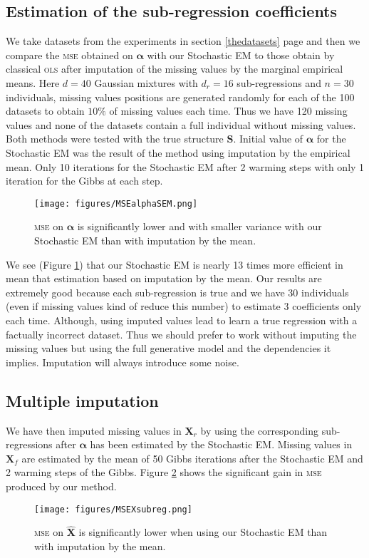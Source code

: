 \documentclass[12pt,a4paper]{report}
\begin{document}
		\subsection{Estimation of the sub-regression coefficients}
			We take datasets from the experiments in section \ref{thedatasets} page \pageref{thedatasets} and then we compare the \textsc{mse} obtained on $\boldsymbol{\alpha}$ with our Stochastic EM to those obtain by classical \textsc{ols} after imputation of the missing values by the marginal empirical means. Here $d=40$ Gaussian mixtures with $d_r=16$ sub-regressions and $n=30$ individuals,  missing values positions are generated randomly for each of the 100 datasets to obtain $10 \%$ of missing values each time. Thus we have 120 missing values and none of the datasets contain a full individual without missing values.
Both methods were tested with the true structure $\boldsymbol{S}$. Initial value of $\boldsymbol{\alpha}$ for the Stochastic EM was the result of the method using imputation by the empirical mean. Only 10 iterations for the Stochastic EM after 2 warming steps with only 1 iteration for the Gibbs at each step.

\begin{figure}[h!]
	\centering
	\texttt{[image: figures/MSEalphaSEM.png]} 
	\caption{\textsc{mse} on $\boldsymbol{\alpha}$ is significantly lower and with smaller variance with our Stochastic EM than with imputation by the mean.}\label{MSEalphaSEM}
\end{figure}

	We see (Figure \ref{MSEalphaSEM}) that our Stochastic EM is nearly 13 times more efficient in mean that estimation based on imputation by the mean. Our results are extremely good because each sub-regression is true and we have 30 individuals (even if missing values kind of reduce this number) to estimate 3 coefficients only each time. Although, using imputed values lead to learn a true regression with a factually incorrect dataset. Thus we should prefer to work without imputing the missing values but using the full generative model and the dependencies it implies. Imputation will always introduce some noise.

		
			\subsection{Multiple imputation}\label{multimput}
			We have then imputed missing values in $\boldsymbol{X}_r$  by using the corresponding sub-regressions after $\boldsymbol{\alpha}$ has been estimated  by the Stochastic EM.
			Missing values in $\boldsymbol{X}_f$ are estimated by the mean of 50 Gibbs iterations after the Stochastic EM and 2 warming steps of the Gibbs. Figure \ref{MSEXsubreg} shows the significant gain in \textsc{mse} produced by our method.
			\begin{figure}[h!]
	\centering
	\texttt{[image: figures/MSEXsubreg.png]} 
	\caption{\textsc{mse} on $\hat{\boldsymbol{X}}$ is significantly lower when using our Stochastic EM than with imputation by the mean.}\label{MSEXsubreg}
\end{figure}  
\FloatBarrier
\end{document}
